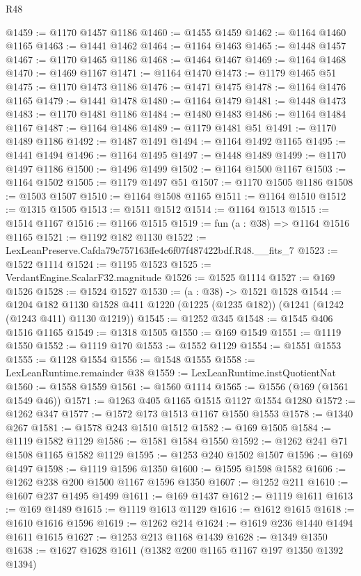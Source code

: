 \begin{lexlean}{R48}
\begin{coremodule}
@1459 := @1170 @1457 @1186
@1460 := @1455 @1459
@1462 := @1164 @1460 @1165
@1463 := @1441 @1462
@1464 := @1164 @1463
@1465 := @1448 @1457
@1467 := @1170 @1465 @1186
@1468 := @1464 @1467
@1469 := @1164 @1468
@1470 := @1469 @1167
@1471 := @1164 @1470
@1473 := @1179 @1465 @51
@1475 := @1170 @1473 @1186
@1476 := @1471 @1475
@1478 := @1164 @1476 @1165
@1479 := @1441 @1478
@1480 := @1164 @1479
@1481 := @1448 @1473
@1483 := @1170 @1481 @1186
@1484 := @1480 @1483
@1486 := @1164 @1484 @1167
@1487 := @1164 @1486
@1489 := @1179 @1481 @51
@1491 := @1170 @1489 @1186
@1492 := @1487 @1491
@1494 := @1164 @1492 @1165
@1495 := @1441 @1494
@1496 := @1164 @1495
@1497 := @1448 @1489
@1499 := @1170 @1497 @1186
@1500 := @1496 @1499
@1502 := @1164 @1500 @1167
@1503 := @1164 @1502
@1505 := @1179 @1497 @51
@1507 := @1170 @1505 @1186
@1508 := @1503 @1507
@1510 := @1164 @1508 @1165
@1511 := @1164 @1510
@1512 := @1315 @1505
@1513 := @1511 @1512
@1514 := @1164 @1513
@1515 := @1514 @1167
@1516 := @1166 @1515
@1519 := fun (a : @38) => @1164 @1516 @1165
@1521 := @1192 @182 @1130
@1522 := LexLeanPreserve.Cafda79c757163ffe4c6f07f487422bdf.R48.__fits_7
@1523 := @1522 @1114
@1524 := @1195 @1523
@1525 := VerdantEngine.ScalarF32.magnitude
@1526 := @1525 @1114
@1527 := @169 @1526
@1528 := @1524 @1527
@1530 := (a : @38) -> @1521 @1528
@1544 := @1204
    @182
    @1130
    @1528
    @411
    @1220
    (@1225 (@1235 @182))
    (@1241 (@1242 (@1243 @411) @1130 @1219))
@1545 := @1252 @345
@1548 := @1545 @406 @1516 @1165
@1549 := @1318 @1505
@1550 := @169 @1549
@1551 := @1119 @1550
@1552 := @1119 @170
@1553 := @1552 @1129
@1554 := @1551 @1553
@1555 := @1128 @1554
@1556 := @1548 @1555
@1558 := LexLeanRuntime.remainder @38
@1559 := LexLeanRuntime.instQuotientNat
@1560 := @1558 @1559
@1561 := @1560 @1114
@1565 := @1556 (@169 (@1561 @1549 @46))
@1571 := @1263 @405 @1165 @1515 @1127 @1554 @1280
@1572 := @1262 @347
@1577 := @1572 @173 @1513 @1167 @1550 @1553
@1578 := @1340 @267
@1581 := @1578 @243 @1510 @1512
@1582 := @169 @1505
@1584 := @1119 @1582 @1129
@1586 := @1581 @1584 @1550
@1592 := @1262 @241 @71 @1508 @1165 @1582 @1129
@1595 := @1253 @240 @1502 @1507
@1596 := @169 @1497
@1598 := @1119 @1596 @1350
@1600 := @1595 @1598 @1582
@1606 := @1262 @238 @200 @1500 @1167 @1596 @1350
@1607 := @1252 @211
@1610 := @1607 @237 @1495 @1499
@1611 := @169 @1437
@1612 := @1119 @1611
@1613 := @169 @1489
@1615 := @1119 @1613 @1129
@1616 := @1612 @1615
@1618 := @1610 @1616 @1596
@1619 := @1262 @214
@1624 := @1619 @236 @1440 @1494 @1611 @1615
@1627 := @1253 @213 @1168 @1439
@1628 := @1349 @1350
@1638 := @1627 @1628 @1611 (@1382 @200 @1165 @1167 @197 @1350 @1392 @1394)

\end{coremodule}
\end{lexlean}
